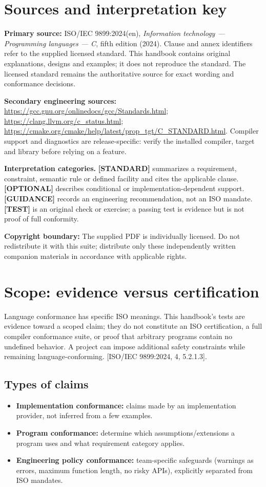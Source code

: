 \documentclass[10pt,letterpaper,oneside]{report}
\newcommand{\refcl}[1]{\textsf{\footnotesize[ISO/IEC 9899:2024, #1]}}
\begin{document}
\chapter*{Sources and interpretation key}
\textbf{Primary source:} ISO/IEC 9899:2024(en), \emph{Information technology --- Programming languages --- C}, fifth edition (2024). Clause and annex identifiers refer to the supplied licensed standard. This handbook contains original explanations, designs and examples; it does not reproduce the standard. The licensed standard remains the authoritative source for exact wording and conformance decisions.\par
\textbf{Secondary engineering sources:} \url{https://gcc.gnu.org/onlinedocs/gcc/Standards.html}; \url{https://clang.llvm.org/c_status.html}; \url{https://cmake.org/cmake/help/latest/prop_tgt/C_STANDARD.html}. Compiler support and diagnostics are release-specific: verify the installed compiler, target and library before relying on a feature.\par
\begin{keybox}\textbf{Interpretation categories.} \textbf{[STANDARD]} summarizes a requirement, constraint, semantic rule or defined facility and cites the applicable clause. \textbf{[OPTIONAL]} describes conditional or implementation-dependent support. \textbf{[GUIDANCE]} records an engineering recommendation, not an ISO mandate. \textbf{[TEST]} is an original check or exercise; a passing test is evidence but is not proof of full conformity.\end{keybox}
\textbf{Copyright boundary:} The supplied PDF is individually licensed. Do not redistribute it with this suite; distribute only these independently written companion materials in accordance with applicable rights.\par


\chapter{Scope: evidence versus certification}
Language conformance has specific ISO meanings. This handbook's tests are evidence toward a scoped claim; they do not constitute an ISO certification, a full compiler conformance suite, or proof that arbitrary programs contain no undefined behavior. A project can impose additional safety constraints while remaining language-conforming. \refcl{4, 5.2.1.3}.
\section{Types of claims}
\begin{itemize}
\item \textbf{Implementation conformance:} claims made by an implementation provider, not inferred from a few examples.
\item \textbf{Program conformance:} determine which assumptions/extensions a program uses and what requirement category applies.
\item \textbf{Engineering policy conformance:} team-specific safeguards (warnings as errors, maximum function length, no risky APIs), explicitly separated from ISO mandates.
\end{itemize}
\end{document}
